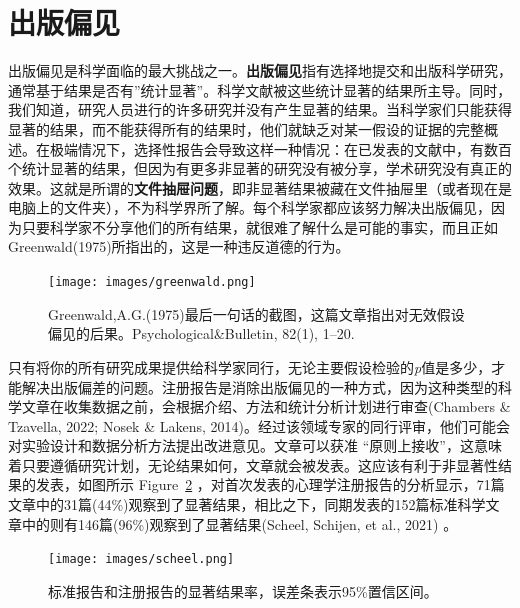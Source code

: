 \documentclass[
  letterpaper,
  DIV=11,
  numbers=noendperiod]{scrreprt}
\begin{document}
\hypertarget{publicationbias}{%
\section{出版偏见}\label{publicationbias}}

出版偏见是科学面临的最大挑战之一。\textbf{出版偏见}指有选择地提交和出版科学研究，通常基于结果是否有''统计显著''。科学文献被这些统计显著的结果所主导。同时，我们知道，研究人员进行的许多研究并没有产生显著的结果。当科学家们只能获得显著的结果，而不能获得所有的结果时，他们就缺乏对某一假设的证据的完整概述。在极端情况下，选择性报告会导致这样一种情况：在已发表的文献中，有数百个统计显著的结果，但因为有更多非显著的研究没有被分享，学术研究没有真正的效果。这就是所谓的\textbf{文件抽屉问题}，即非显著结果被藏在文件抽屉里（或者现在是电脑上的文件夹），不为科学界所了解。每个科学家都应该努力解决出版偏见，因为只要科学家不分享他们的所有结果，就很难了解什么是可能的事实，而且正如Greenwald(1975)所指出的，这是一种违反道德的行为。

\begin{figure}

{\centering \texttt{[image: images/greenwald.png]}

}

\caption{\label{fig-greenwald}Greenwald,A.G.(1975)最后一句话的截图，这篇文章指出对无效假设偏见的后果。Psychological\&Bulletin,
82(1), 1--20.}

\end{figure}

只有将你的所有研究成果提供给科学家同行，无论主要假设检验的\emph{p}值是多少，才能解决出版偏差的问题。注册报告是消除出版偏见的一种方式，因为这种类型的科学文章在收集数据之前，会根据介绍、方法和统计分析计划进行审查(Chambers
\& Tzavella, 2022; Nosek \& Lakens,
2014)。经过该领域专家的同行评审，他们可能会对实验设计和数据分析方法提出改进意见。文章可以获准
``原则上接收''，这意味着只要遵循研究计划，无论结果如何，文章就会被发表。这应该有利于非显著性结果的发表，如图所示
Figure~\ref{fig-scheel}
，对首次发表的心理学注册报告的分析显示，71篇文章中的31篇(44\%)观察到了显著结果，相比之下，同期发表的152篇标准科学文章中的则有146篇(96\%)观察到了显著结果(Scheel,
Schijen, et al., 2021) 。

\begin{figure}

{\centering \texttt{[image: images/scheel.png]}

}

\caption{\label{fig-scheel}标准报告和注册报告的显著结果率，误差条表示95\%置信区间。}

\end{figure}
\end{document}
